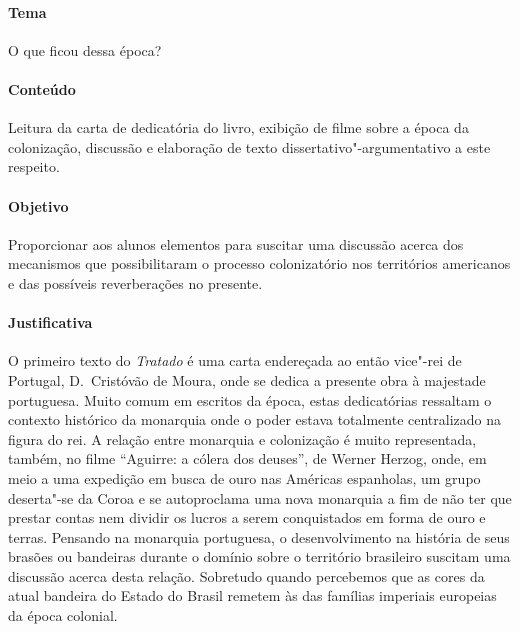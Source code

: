 \documentclass[12pt]{extarticle}
\begin{document}
{\paragraph{Tema} O que ficou dessa época?

\paragraph{Conteúdo} Leitura da carta de dedicatória do livro, exibição de 
filme sobre a época da colonização, discussão e elaboração de texto 
dissertativo"-argumentativo a este respeito.

\paragraph{Objetivo} Proporcionar aos alunos elementos para suscitar
uma discussão acerca dos mecanismos que possibilitaram o processo 
colonizatório nos territórios americanos e das possíveis reverberações
no presente.

\paragraph{Justificativa} O primeiro texto do \emph{Tratado} é uma carta
endereçada ao então vice"-rei de Portugal, D.~Cristóvão de Moura, onde 
se dedica a presente obra à majestade portuguesa. Muito comum em escritos
da época, estas dedicatórias ressaltam o contexto histórico da monarquia 
onde o poder estava totalmente centralizado na figura do rei.
A relação entre monarquia e colonização é muito representada, também,
no filme ``Aguirre: a cólera dos deuses'', de Werner Herzog, onde, em
meio a uma expedição em busca de ouro nas Américas espanholas, um grupo 
deserta"-se da Coroa e se autoproclama uma nova monarquia a fim de não ter 
que prestar contas nem dividir os lucros a serem conquistados em forma
de ouro e terras.
Pensando na monarquia portuguesa, o desenvolvimento na história de seus
brasões ou bandeiras durante o domínio sobre o território brasileiro
suscitam uma discussão acerca desta relação. Sobretudo quando percebemos
que as cores da atual bandeira do Estado do Brasil remetem às das famílias
imperiais europeias da época colonial. 

}
\end{document}
